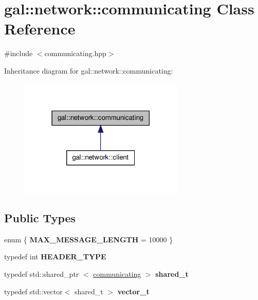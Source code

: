 \hypertarget{classgal_1_1network_1_1communicating}{\section{gal\-:\-:network\-:\-:communicating \-Class \-Reference}
\label{classgal_1_1network_1_1communicating}
}


{\ttfamily \#include $<$communicating.\-hpp$>$}



\-Inheritance diagram for gal\-:\-:network\-:\-:communicating\-:\nopagebreak
\begin{figure}[H]
\begin{center}
\leavevmode
\includegraphics[width=222pt]{classgal_1_1network_1_1communicating__inherit__graph}
\end{center}
\end{figure}
\subsection*{\-Public \-Types}
\begin{DoxyCompactItemize}
\item 
enum \{ {\bfseries \-M\-A\-X\-\_\-\-M\-E\-S\-S\-A\-G\-E\-\_\-\-L\-E\-N\-G\-T\-H} =  10000
 \}
\item 
\hypertarget{classgal_1_1network_1_1communicating_aef6c11aca9b227ec65e289b5f194cd83}{typedef int {\bfseries \-H\-E\-A\-D\-E\-R\-\_\-\-T\-Y\-P\-E}}\label{classgal_1_1network_1_1communicating_aef6c11aca9b227ec65e289b5f194cd83}

\item 
\hypertarget{classgal_1_1network_1_1communicating_a20c6f2dc53a296b6b34a82d5dc8f894a}{typedef std\-::shared\-\_\-ptr\*
$<$ \hyperlink{classgal_1_1network_1_1communicating}{communicating} $>$ {\bfseries shared\-\_\-t}}\label{classgal_1_1network_1_1communicating_a20c6f2dc53a296b6b34a82d5dc8f894a}

\item 
\hypertarget{classgal_1_1network_1_1communicating_acde720b70acbd7aecc86d2ebd4d91113}{typedef std\-::vector$<$ shared\-\_\-t $>$ {\bfseries vector\-\_\-t}}\label{classgal_1_1network_1_1communicating_acde720b70acbd7aecc86d2ebd4d91113}

\end{DoxyCompactItemize}
